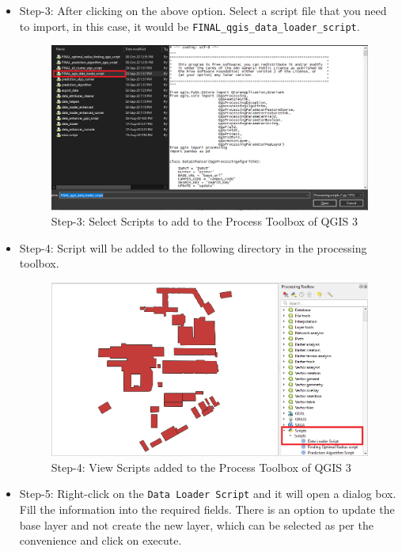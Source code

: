 \begin{itemize}
\item Step-3: After clicking on the above option. Select a script file that you need to import, in this case, it would be \texttt{FINAL\_qgis\_data\_loader\_script}.

\begin{figure}[H]
\centering
\includegraphics[width=12cm,keepaspectratio=true]{resources/step3.PNG}
\caption{Step-3: Select Scripts to  add to the Process Toolbox of QGIS 3}
\label{fig:selectscript}
\end{figure}

\item Step-4: Script will be added to the following directory in the processing toolbox.

\begin{figure}[H]
\centering
\includegraphics[width=12cm,keepaspectratio=true]{resources/step4.PNG}
\caption{Step-4: View Scripts added to the Process Toolbox of QGIS 3}
\label{fig:ads}
\end{figure}

\item Step-5: Right-click on the \texttt{Data Loader Script} and it will open a dialog box. Fill the information into the required fields. There is an option to update the base layer and not create the new layer, which can be selected as per the convenience and click on execute.


\end{itemize}
